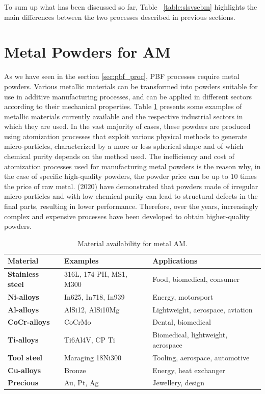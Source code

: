 To sum up what has been discussed so far, Table ~\ref{table:slsvsebm} highlights the main differences between the two processes described in previous sections.


\vfill
\section{Metal Powders for AM} 
\label{sec:metalpowders}
As we have seen in the section \ref{sec:pbf_proc}, PBF processes require metal powders. Various metallic materials can be transformed into powders suitable for use in additive manufacturing processes, and can be applied in different sectors according to their mechanical properties. Table \ref{table:materialAMmetal} presents some examples of metallic materials currently available and the respective industrial sectors in which they are used. In the vast majority of cases, these powders are produced using atomization processes that exploit various physical methods to generate micro-particles, characterized by a more or less spherical shape and of which chemical purity depends on the method used. The inefficiency and cost of atomization processes used for manufacturing metal powders is the reason why, in the case of specific high-quality powders, the powder price can be up to 10 times the price of raw metal. \citeauthor{deng_origin_2020} (2020) have demonstrated that powders made of irregular micro-particles and with low chemical purity can lead to structural defects in the final parts, resulting in lower performance. Therefore, over the years, increasingly complex and expensive processes have been developed to obtain higher-quality powders.
\begin{table}[H]
\centering 
\small
    \begin{tabular}{|l l l|}
    \hline
    \rowcolor{bluepoli!40}
    \textbf{Material} & \textbf{Examples} & \textbf{Applications}\\
    \hline \hline
    \textbf{Stainless steel} & 316L, 174-PH, MS1, M300 & Food, biomedical, consumer \T\B\\
    \textbf{Ni-alloys} & In625, In718, In939 & Energy, motorsport\T\B\\
    \textbf{Al-alloys} & AlSi12, AlSi10Mg & Lightweight, aerospace, aviation\T\B\\
    \textbf{CoCr-alloys} & CoCrMo & Dental, biomedical\T\B\\
    \textbf{Ti-alloys} & Ti6Al4V, CP Ti & Biomedical, lightweight, aerospace\T\B\\
    \textbf{Tool steel} & Maraging 18Ni300 & Tooling, aerospace, automotive\T\B\\
    \textbf{Cu-alloys} & Bronze & Energy, heat exchanger\T\B\\
    \textbf{Precious} & Au, Pt, Ag & Jewellery, design\T\B\\
    \hline
    \end{tabular}
    \\[10pt]
    \caption{Material availability for metal AM.}
    \label{table:materialAMmetal}
\end{table}
